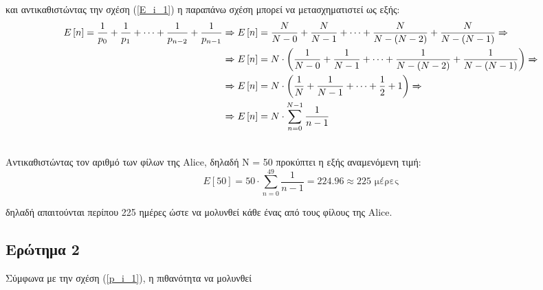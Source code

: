και αντικαθιστώντας την σχέση (\ref{E_i_1}) η παραπάνω σχέση μπορεί να μετασχηματιστεί ως εξής:
\begin{align}
	E\left[n\right] = \frac{1}{p_{0}}  + \frac{1}{p_{1}} + \cdots  + \frac{1}{p_{n-2}} + \frac{1}{p_{n-1}}& \xRightarrow{} E\left[n\right] = \frac{N}{N - 0}  + \frac{N}{N - 1} + \cdots  + \frac{N}{N - (N-2)} + \frac{N}{N - (N-1)} \xRightarrow{}  \notag \\
																										  & \xRightarrow{} E\left[n\right] =  N \cdot \left(\frac{1}{N - 0}  + \frac{1}{N - 1} + \cdots  + \frac{1}{N - (N-2)} + \frac{1}{N - (N-1)} \right) \xRightarrow{}  \notag \\
																										  & \xRightarrow{} E\left[n\right] = N \cdot \left(\frac{1}{N}  + \frac{1}{N - 1} + \cdots  + \frac{1}{2} + 1 \right) \xRightarrow{}  \notag \\
																										  & \xRightarrow{} E\left[n\right] = N \cdot \sum_{n = 0}^{N - 1} \frac{1}{n - 1}
\end{align}

\noindent\\
Αντικαθιστώντας τον αριθμό των φίλων της Alice, δηλαδή Ν = 50 προκύπτει η εξής αναμενόμενη τιμή:
\begin{equation*}
	E\left[50\right] = 50 \cdot \sum_{n = 0}^{49}  \frac{1}{n - 1} = 224.96 \approx 225 \text{ μέρες}
\end{equation*}

δηλαδή απαιτούνται περίπου 225 ημέρες ώστε να μολυνθεί κάθε ένας από τους φίλους της Alice.

\clearpage
\subsection*{Ερώτημα 2}
\label{ex1q2}

Σύμφωνα με την σχέση (\ref{p_i_1}), η πιθανότητα να μολυνθεί 